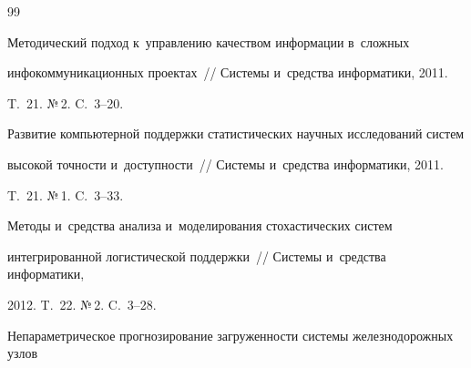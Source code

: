 {\small\frenchspacing


{%




\begin{thebibliography}{99}









Методический подход к~управлению качеством информации в~сложных


инфокоммуникационных проектах~/\!\!/ Системы и~средства информатики, 2011.


T.~21. №\,2. C.~3--20.















Развитие компьютерной поддержки статистических научных исследований систем


высокой точности и~доступности~/\!\!/ Системы и~средства информатики, 2011.


T.~21. №\,1. C.~3--33.









Методы и~средства анализа и~моделирования стохастических систем


интегрированной логистической поддержки~/\!\!/ Системы и~средства информатики,


2012.  T.~22. №\,2. C.~3--28.









Непараметрическое прогнозирование загруженности системы железнодорожных узлов



\end{thebibliography}}}
